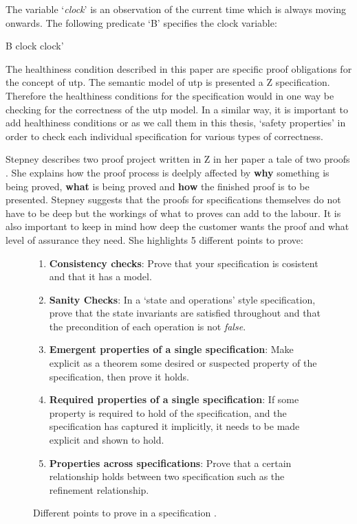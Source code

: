 \begin{exam}
The variable `\emph{clock}' is an observation of the current time which is always moving onwards. The following predicate `B' specifies the clock variable:

\begin{zed}
B  clock \leq clock'
\end{zed}
\end{exam}

The healthiness condition described in this paper are specific proof obligations for the concept of \gls{utp}. The semantic model of \gls{utp} is presented a Z specification. Therefore the healthiness conditions for the specification would in one way be checking for the correctness of the \gls{utp} model. In a similar way, it is important to add healthiness conditions or as we call them in this thesis, `safety properties' in order to check each individual specification for various types of correctness.

Stepney describes two proof project written in Z in her paper a tale of two proofs \cite{stepney1998tale}. She explains how the proof process is deelply affected by \textbf{why} something is being proved, \textbf{what} is being proved and \textbf{how} the finished proof is to be presented. Stepney suggests that the proofs for specifications themselves do not have to be deep but the workings of what to proves can add to the labour. It is also important to keep in mind how deep the customer wants the proof and what level of assurance they need. She highlights 5 different points to prove:

\begin{figure}[H]
\begin{enumerate}
\item \textbf{Consistency checks}: Prove that your specification is cosistent and that it has a model.

\item \textbf{Sanity Checks}: In a `state and operations' style specification, prove that the state invariants are satisfied throughout and that the precondition of each operation is not \emph{false}.

\item \textbf{Emergent properties of a single specification}: Make explicit as a theorem some desired or suspected property of the specification, then prove it holds.

\item \textbf{Required properties of a single specification}: If some property is required to hold of the specification, and the specification has captured it implicitly, it needs to be made explicit and shown to hold.

\item \textbf{Properties across specifications}: Prove that a certain relationship holds between two specification such as the refinement relationship.
\end{enumerate}
\caption{Different points to prove in a specification \cite{stepney1998tale}. \label{fig:ptp}}
\end{figure}

